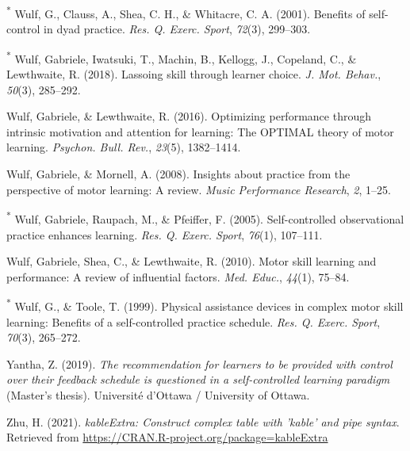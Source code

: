 \documentclass[
  english,
  man,floatsintext]{apa7}
\newlength{\cslhangindent}
\newlength{\cslentryspacingunit} %
\newenvironment{CSLReferences}[2] %
 {%
  \setlength{\parindent}{0pt}
  \ifodd #1
  \let\oldpar\par
  \def\par{\hangindent=\cslhangindent\oldpar}
  \fi
  \setlength{\parskip}{#2\cslentryspacingunit}
 }%
 {}
\begin{document}
\begin{CSLReferences}{1}{0}
\leavevmode{}%
\textsuperscript{*} Wulf, G., Clauss, A., Shea, C. H., \& Whitacre, C. A. (2001). Benefits of self-control in dyad practice. \emph{Res. Q. Exerc. Sport}, \emph{72}(3), 299--303.

\leavevmode{}%
\textsuperscript{*} Wulf, Gabriele, Iwatsuki, T., Machin, B., Kellogg, J., Copeland, C., \& Lewthwaite, R. (2018). Lassoing skill through learner choice. \emph{J. Mot. Behav.}, \emph{50}(3), 285--292.

\leavevmode{}%
Wulf, Gabriele, \& Lewthwaite, R. (2016). Optimizing performance through intrinsic motivation and attention for learning: The {OPTIMAL} theory of motor learning. \emph{Psychon. Bull. Rev.}, \emph{23}(5), 1382--1414.

\leavevmode{}%
Wulf, Gabriele, \& Mornell, A. (2008). Insights about practice from the perspective of motor learning: A review. \emph{Music Performance Research}, \emph{2}, 1--25.

\leavevmode{}%
\textsuperscript{*} Wulf, Gabriele, Raupach, M., \& Pfeiffer, F. (2005). Self-controlled observational practice enhances learning. \emph{Res. Q. Exerc. Sport}, \emph{76}(1), 107--111.

\leavevmode{}%
Wulf, Gabriele, Shea, C., \& Lewthwaite, R. (2010). Motor skill learning and performance: A review of influential factors. \emph{Med. Educ.}, \emph{44}(1), 75--84.

\leavevmode{}%
\textsuperscript{*} Wulf, G., \& Toole, T. (1999). Physical assistance devices in complex motor skill learning: Benefits of a self-controlled practice schedule. \emph{Res. Q. Exerc. Sport}, \emph{70}(3), 265--272.

\leavevmode{}%
Yantha, Z. (2019). \emph{The recommendation for learners to be provided with control over their feedback schedule is questioned in a self-controlled learning paradigm} (Master's thesis). Universit{é} d'Ottawa / University of Ottawa.

\leavevmode{}%
Zhu, H. (2021). \emph{kableExtra: Construct complex table with 'kable' and pipe syntax}. Retrieved from \url{https://CRAN.R-project.org/package=kableExtra}

\end{CSLReferences}
\end{document}
